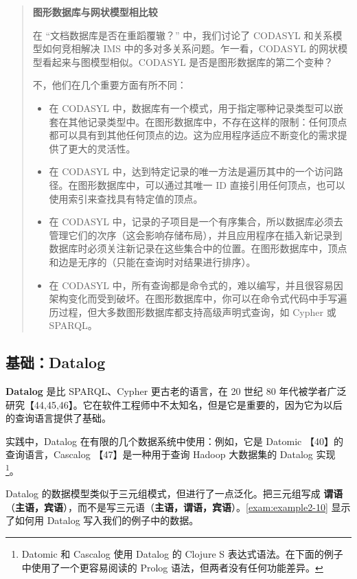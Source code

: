 \begin{quote}
    \textbf{图形数据库与网状模型相比较}

    在 “文档数据库是否在重蹈覆辙？” 中，我们讨论了 CODASYL 和关系模型如何竞相解决 IMS 中的多对多关系问题。乍一看，CODASYL 的网状模型看起来与图模型相似。CODASYL 是否是图形数据库的第二个变种？

    不，他们在几个重要方面有所不同：
    \begin{itemize}
        \item 在 CODASYL 中，数据库有一个模式，用于指定哪种记录类型可以嵌套在其他记录类型中。在图形数据库中，不存在这样的限制：任何顶点都可以具有到其他任何顶点的边。这为应用程序适应不断变化的需求提供了更大的灵活性。
        \item 在 CODASYL 中，达到特定记录的唯一方法是遍历其中的一个访问路径。在图形数据库中，可以通过其唯一 ID 直接引用任何顶点，也可以使用索引来查找具有特定值的顶点。
        \item 在 CODASYL 中，记录的子项目是一个有序集合，所以数据库必须去管理它们的次序（这会影响存储布局），并且应用程序在插入新记录到数据库时必须关注新记录在这些集合中的位置。在图形数据库中，顶点和边是无序的（只能在查询时对结果进行排序）。
        \item 在 CODASYL 中，所有查询都是命令式的，难以编写，并且很容易因架构变化而受到破坏。在图形数据库中，你可以在命令式代码中手写遍历过程，但大多数图形数据库都支持高级声明式查询，如 Cypher 或 SPARQL。
    \end{itemize}
\end{quote}

\subsection{基础：Datalog}

\textbf{Datalog} 是比 SPARQL、Cypher 更古老的语言，在 20 世纪 80 年代被学者广泛研究【44,45,46】。它在软件工程师中不太知名，但是它是重要的，因为它为以后的查询语言提供了基础。

实践中，Datalog 在有限的几个数据系统中使用：例如，它是 Datomic 【40】的查询语言，Cascalog 【47】是一种用于查询 Hadoop 大数据集的 Datalog 实现 \footnote{Datomic 和 Cascalog 使用 Datalog 的 Clojure S 表达式语法。在下面的例子中使用了一个更容易阅读的 Prolog 语法，但两者没有任何功能差异。}。

Datalog 的数据模型类似于三元组模式，但进行了一点泛化。把三元组写成 \textbf{谓语}（\textbf{主语，宾语}），而不是写三元语（\textbf{主语，谓语，宾语}）。\autoref{exam:example2-10} 显示了如何用 Datalog 写入我们的例子中的数据。


